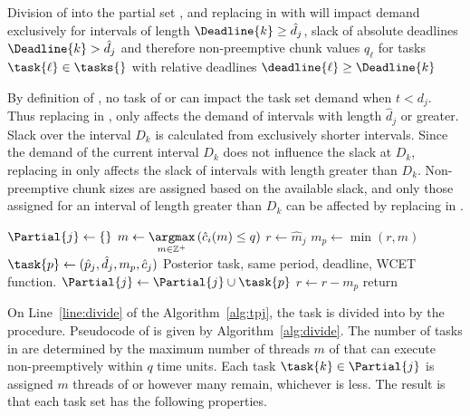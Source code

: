 \begin{prop}
\label{prop:divisions}
Division of  into the partial set , and replacing
 in \tasks{} with  will impact demand exclusively
for intervals of length ${\Deadline{k} \ge \hat{d}_j}$, 
slack of absolute deadlines ${\Deadline{k} > \hat{d}_j}$ and therefore
non-preemptive chunk values ${q_\ell}$ for tasks ${\task{\ell} \in
  \tasks{}}$ with relative deadlines ${\deadline{\ell} \ge \Deadline{k}}$

By definition of , no task of  or 
can impact the task set \tasks{} demand  when
${t < d_j}$. Thus replacing  in \tasks{}, only affects the
demand of intervals with length ${\hat{d}_j}$ or greater. Slack
over the interval ${D_k}$ is calculated from exclusively shorter
intervals. Since the demand of the current interval ${D_k}$ does not
influence the slack at ${D_k}$, replacing  in \tasks{} only
affects the slack of intervals with length greater than
${D_k}$. Non-preemptive chunk sizes are assigned based on the
available slack, and only those assigned for an interval of length
greater than ${D_k}$ can be affected by replacing  in \tasks{}. 
\end{prop}

\begin{algorithm}[ht]
  \caption{}
  \label{alg:divide}
  \begin{algorithmic}[1]
        \State ${\Partial{j} \gets \{\}}$
        \State ${m \gets \underset{m \in \mathbb{Z}^+}\argmax
          \left(\hat{c}_i(m) \le q \right)}$
        \label{line:m-max}
        \State ${r \gets \hat{m}_j}$
            \State ${m_p \gets \min(r, m)}$
            \State ${\task{p} \gets (\hat{p}_j, \hat{d}_j, m_p,
              \hat{c}_j)}$
            \Comment Posterior task, same period, deadline, WCET function.
            \State ${\Partial{j} \gets \Partial{j} \cup \task{p}}$
            \State ${r \gets r - m_p}$
        \EndWhile
      \State return 
    \EndProcedure
  \end{algorithmic}
\end{algorithm}

On Line~\ref{line:divide} of the \tpj{} Algorithm~\ref{alg:tpj}, the task
 is divided into  by the 
procedure. Pseudocode of  is given by
Algorithm~\ref{alg:divide}. The number of tasks in  are
determined by the maximum number of threads ${m}$ of  that can
execute non-preemptively within ${q}$ time units. Each task ${\task{k}
  \in \Partial{j}}$ is assigned ${m}$ threads of  or however
many remain, whichever is less. The result is that each task set
has the following properties. 


